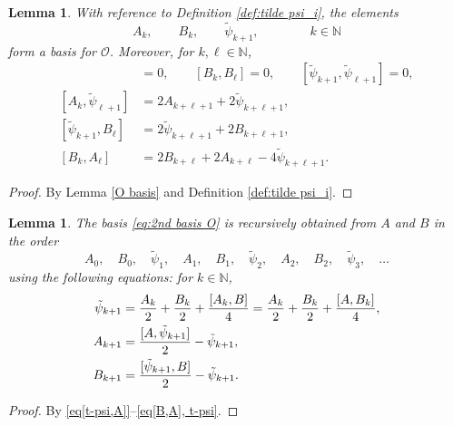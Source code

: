 \documentclass[11pt]{article}%
\theoremstyle{definition}
\theoremstyle{plain}
\newtheorem{lemma}[definition]{Lemma}
\begin{document}
\begin{lemma}\label{O basis-2}
With reference to Definition \ref{def:tilde psi_i}, the elements
\begin{equation}\label{eq:2nd basis O}
	A_k, \qquad B_k, \qquad \tilde\psi_{k+1}, \qquad \qquad k \in \mathbb{N}
\end{equation}
form a basis for $\mathcal{O}$.
Moreover, for $k, \ell \in \mathbb{N}$,
\begin{align}
	[A_k, A_\ell] & = 0, \qquad
	[B_k, B_\ell] = 0, \qquad
	[\tilde\psi_{k+1}, \tilde\psi_{\ell+1}] = 0, \label{eq[A,B,t-psi]}\\[0.2em]
	[A_k, \tilde\psi_{\ell+1}] & = 2A_{k+\ell+1} + 2\tilde\psi_{k+\ell+1}, \label{eq[t-psi,A]}\\[0.2em]
	[\tilde\psi_{k+1}, B_\ell] & = 2\tilde\psi_{k+\ell+1} + 2B_{k+\ell+1} , \label{eq[B,t-psi]}\\[0.2em]
	[B_k, A_\ell] & = 2B_{k+\ell} + 2A_{k+\ell} - 4\tilde\psi_{k+\ell+1}. \label{eq[B,A], t-psi}
\end{align}
\end{lemma}
\begin{proof}
By Lemma \ref{O basis} and Definition \ref{def:tilde psi_i}.
\end{proof}



\begin{lemma}\label{lem:2nd-rec}
The basis \eqref{eq:2nd basis O} is recursively obtained from $A$ and $B$ in the order
$$
	A_0, \quad B_0, \quad \tilde\psi_1, \quad 
	A_1, \quad B_1, \quad \tilde\psi_2, \quad 
	A_2, \quad B_2, \quad \tilde\psi_3, \quad \ldots
$$
using the following equations: for $k \in \mathbb{N}$,
\begin{align}
	\tilde\psi_{k+1} & = \frac{A_k}{2} + \frac{B_k}{2} + \frac{[A_k, B]}{4} = \frac{A_k}{2} + \frac{B_k}{2} + \frac{[A, B_k]}{4}, \label{eq:rec tpsi}\\
	A_{k+1} & = \frac{[A, \tilde\psi_{k+1}]}{2} - \tilde\psi_{k+1}, \notag \\
	B_{k+1} & = \frac{[\tilde\psi_{k+1}, B]}{2} - \tilde\psi_{k+1}. \notag
\end{align}
\end{lemma}
\begin{proof}
By \eqref{eq[t-psi,A]}--\eqref{eq[B,A], t-psi}.
\end{proof}
\end{document}
